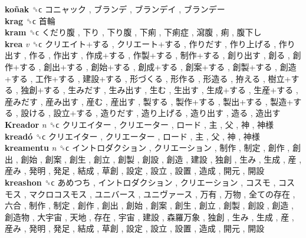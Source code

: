 \textbf{koñak} ␝ϲ   コニャック ,  ブランデ ,  ブランデイ ,  ブランデー   \\
\textbf{krag} ␝ϲ   首輪   \\
\textbf{kram} ␝ϲ   くだり腹 ,  下り ,  下り腹 ,  下痢 ,  下痢症 ,  瀉腹 ,  痢 ,  腹下し   \\
\textbf{krea} \emph{v}  ␝ϲ   クリエイト+する ,  クリエート+する ,  作りだす ,  作り上げる ,  作り出す ,  作る ,  作出す ,  作成+する ,  作製+する ,  制作+する ,  創り出す ,  創る ,  創作+する ,  創出+する ,  創始+する ,  創成+する ,  創案+する ,  創製+する ,  創造+する ,  工作+する ,  建設+する ,  形づくる ,  形作る ,  形造る ,  拵える ,  樹立+する ,  独創+する ,  生みだす ,  生み出す ,  生む ,  生出す ,  生成+する ,  生産+する ,  産みだす ,  産み出す ,  産む ,  産出す ,  製する ,  製作+する ,  製出+する ,  製造+する ,  設ける ,  設立+する ,  造りだす ,  造り上げる ,  造り出す ,  造る ,  造出す   \\
\textbf{Kreador} \emph{n}  ␝ϲ   クリエイター ,  クリエーター ,  ロード ,  主 ,  父 ,  神 ,  神様   \\
\textbf{kreadó} ␝ϲ   クリエイター ,  クリエーター ,  ロード ,  主 ,  父 ,  神 ,  神様   \\
\textbf{kreamentu} \emph{n}  ␝ϲ   イントロダクション ,  クリエーション ,  制作 ,  制定 ,  創作 ,  創出 ,  創始 ,  創案 ,  創生 ,  創立 ,  創製 ,  創設 ,  創造 ,  建設 ,  独創 ,  生み ,  生成 ,  産 ,  産み ,  発明 ,  発足 ,  結成 ,  草創 ,  設定 ,  設立 ,  設置 ,  造成 ,  開元 ,  開設   \\
\textbf{kreashon} ␝ϲ   あめつち ,  イントロダクション ,  クリエーション ,  コスモ ,  コスモス ,  マクロコスモス ,  ユニバース ,  ユニヴァース ,  万有 ,  万物 ,  全ての存在 ,  六合 ,  制作 ,  制定 ,  創作 ,  創出 ,  創始 ,  創案 ,  創生 ,  創立 ,  創製 ,  創設 ,  創造 ,  創造物 ,  大宇宙 ,  天地 ,  存在 ,  宇宙 ,  建設 ,  森羅万象 ,  独創 ,  生み ,  生成 ,  産 ,  産み ,  発明 ,  発足 ,  結成 ,  草創 ,  設定 ,  設立 ,  設置 ,  造成 ,  開元 ,  開設   \\
